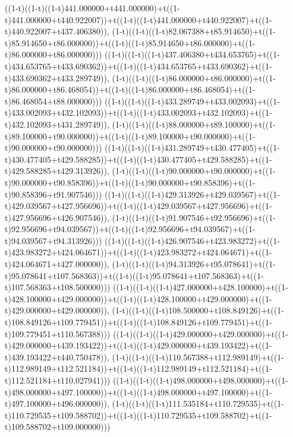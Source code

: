 ((1-t)((1-t)((1-t)441.000000+t441.000000)+t((1-t)441.000000+t440.922007))+t((1-t)((1-t)441.000000+t440.922007)+t((1-t)440.922007+t437.406380)),                                     (1-t)((1-t)((1-t)82.067388+t85.914650)+t((1-t)85.914650+t86.000000))+t((1-t)((1-t)85.914650+t86.000000)+t((1-t)86.000000+t86.000000)))
((1-t)((1-t)((1-t)437.406380+t434.653765)+t((1-t)434.653765+t433.690362))+t((1-t)((1-t)434.653765+t433.690362)+t((1-t)433.690362+t433.289749)),                                     (1-t)((1-t)((1-t)86.000000+t86.000000)+t((1-t)86.000000+t86.468054))+t((1-t)((1-t)86.000000+t86.468054)+t((1-t)86.468054+t88.000000)))
((1-t)((1-t)((1-t)433.289749+t433.002093)+t((1-t)433.002093+t432.102093))+t((1-t)((1-t)433.002093+t432.102093)+t((1-t)432.102093+t431.289749)),                                     (1-t)((1-t)((1-t)88.000000+t89.100000)+t((1-t)89.100000+t90.000000))+t((1-t)((1-t)89.100000+t90.000000)+t((1-t)90.000000+t90.000000)))
((1-t)((1-t)((1-t)431.289749+t430.477405)+t((1-t)430.477405+t429.588285))+t((1-t)((1-t)430.477405+t429.588285)+t((1-t)429.588285+t429.313926)),                                     (1-t)((1-t)((1-t)90.000000+t90.000000)+t((1-t)90.000000+t90.858396))+t((1-t)((1-t)90.000000+t90.858396)+t((1-t)90.858396+t91.907546)))
((1-t)((1-t)((1-t)429.313926+t429.039567)+t((1-t)429.039567+t427.956696))+t((1-t)((1-t)429.039567+t427.956696)+t((1-t)427.956696+t426.907546)),                                     (1-t)((1-t)((1-t)91.907546+t92.956696)+t((1-t)92.956696+t94.039567))+t((1-t)((1-t)92.956696+t94.039567)+t((1-t)94.039567+t94.313926)))
((1-t)((1-t)((1-t)426.907546+t423.983272)+t((1-t)423.983272+t424.064671))+t((1-t)((1-t)423.983272+t424.064671)+t((1-t)424.064671+t427.000000)),                                     (1-t)((1-t)((1-t)94.313926+t95.078641)+t((1-t)95.078641+t107.568363))+t((1-t)((1-t)95.078641+t107.568363)+t((1-t)107.568363+t108.500000)))
((1-t)((1-t)((1-t)427.000000+t428.100000)+t((1-t)428.100000+t429.000000))+t((1-t)((1-t)428.100000+t429.000000)+t((1-t)429.000000+t429.000000)),                                     (1-t)((1-t)((1-t)108.500000+t108.849126)+t((1-t)108.849126+t109.779451))+t((1-t)((1-t)108.849126+t109.779451)+t((1-t)109.779451+t110.567388)))
((1-t)((1-t)((1-t)429.000000+t429.000000)+t((1-t)429.000000+t439.193422))+t((1-t)((1-t)429.000000+t439.193422)+t((1-t)439.193422+t440.750478)),                                     (1-t)((1-t)((1-t)110.567388+t112.989149)+t((1-t)112.989149+t112.521184))+t((1-t)((1-t)112.989149+t112.521184)+t((1-t)112.521184+t110.027941)))
((1-t)((1-t)((1-t)498.000000+t498.000000)+t((1-t)498.000000+t497.100000))+t((1-t)((1-t)498.000000+t497.100000)+t((1-t)497.100000+t496.000000)),                                     (1-t)((1-t)((1-t)111.535184+t110.729535)+t((1-t)110.729535+t109.588702))+t((1-t)((1-t)110.729535+t109.588702)+t((1-t)109.588702+t109.000000)))
